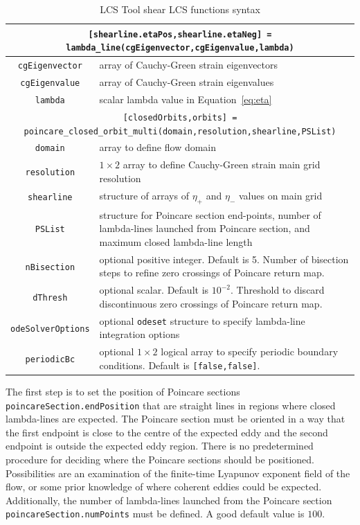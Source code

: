 \documentclass{article}
\begin{document}
\begin{table}
\begin{tabular}{|c|p{}|}
\hline \hline
\multicolumn{2}{|p{\textwidth}|}{\lstinline![shearline.etaPos,shearline.etaNeg] = lambda_line(cgEigenvector,cgEigenvalue,lambda)!}\\
\hline
\lstinline!cgEigenvector! & array of Cauchy-Green strain eigenvectors\\
\hline
\lstinline!cgEigenvalue! & array of Cauchy-Green strain eigenvalues\\
\hline
\lstinline!lambda! & scalar lambda value in Equation~\eqref{eq:eta}\\
\hline \hline
\multicolumn{2}{|p{\textwidth}|}{\lstinline![closedOrbits,orbits] = poincare_closed_orbit_multi(domain,resolution,shearline,PSList)!}\\
\hline
\lstinline!domain! & array to define flow domain\\
\hline
\lstinline!resolution! & $1 \times 2$ array to define Cauchy-Green strain main grid resolution\\
\hline
\lstinline!shearline! & structure of arrays of $\eta_+$ and $\eta_-$ values on main grid\\
\hline
\lstinline!PSList! & structure for Poincare section end-points, number of lambda-lines launched from Poincare section, and maximum closed lambda-line length\\
\hline
\lstinline!nBisection! & optional positive integer. Default is 5. Number of bisection steps to refine zero crossings of Poincare return map.\\
\hline
\lstinline!dThresh! & optional scalar. Default is $10^{-2}$. Threshold to discard discontinuous zero crossings of Poincare return map.\\
\hline
\lstinline!odeSolverOptions! & optional \lstinline!odeset! structure to specify lambda-line integration options\\
\hline
\lstinline!periodicBc! & optional $1 \times 2$ logical array to specify periodic boundary conditions. Default is \lstinline![false,false]!.\\
\hline \hline
\end{tabular}
\caption{LCS Tool shear LCS functions syntax}
\label{t:Shear LCS functions}
\end{table}

The first step is to set the position of Poin\-care sections \lstinline!poincareSection.endPosition! that are straight lines in regions where closed lambda-lines are expected. The Poincare section must be oriented in a way that the first endpoint is close to the centre of the expected eddy and the second endpoint is outside the expected eddy region. There is no predetermined procedure for deciding where the Poincare sections should be positioned. Possibilities are an examination of the finite-time Lyapunov exponent field of the flow, or some prior knowledge of where coherent eddies could be expected. Additionally, the number of lambda-lines launched from the Poincare section \lstinline!poincareSection.numPoints! must be defined. A good default value is $100$.
\end{document}
